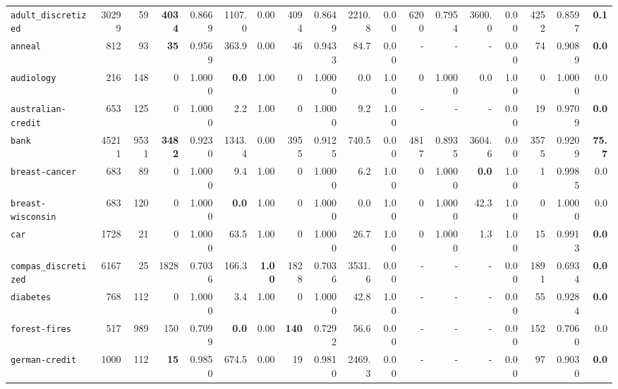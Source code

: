 \begin{tabular}{lccrrrrrrrrrrrrrrr}
\texttt{adult\_discretized} & \multicolumn{1}{r}{30299} & \multicolumn{1}{r}{59}  & \textbf{4034} & 0.8669 & 1107.0 & 0.00 & 4094 & 0.8649 & 2210.8 & 0.00 & 6200 & 0.7954 & 3600.0 & 0.00 & 4252 & 0.8597 & \textbf{0.1}\\
\texttt{anneal} & \multicolumn{1}{r}{812} & \multicolumn{1}{r}{93}  & \textbf{35} & 0.9569 & 363.9 & 0.00 & 46 & 0.9433 & 84.7 & 0.00 & - & - & - & 0.00 & 74 & 0.9089 & \textbf{0.0}\\
\texttt{audiology} & \multicolumn{1}{r}{216} & \multicolumn{1}{r}{148}  & 0 & 1.0000 & \textbf{0.0} & 1.00 & 0 & 1.0000 & 0.0 & 1.00 & 0 & 1.0000 & 0.0 & 1.00 & 0 & 1.0000 & 0.0\\
\texttt{australian-credit} & \multicolumn{1}{r}{653} & \multicolumn{1}{r}{125}  & 0 & 1.0000 & 2.2 & 1.00 & 0 & 1.0000 & 9.2 & 1.00 & - & - & - & 0.00 & 19 & 0.9709 & \textbf{0.0}\\
\texttt{bank} & \multicolumn{1}{r}{45211} & \multicolumn{1}{r}{9531}  & \textbf{3482} & 0.9230 & 1343.4 & 0.00 & 3955 & 0.9125 & 740.5 & 0.00 & 4817 & 0.8935 & 3604.6 & 0.00 & 3575 & 0.9209 & \textbf{75.7}\\
\texttt{breast-cancer} & \multicolumn{1}{r}{683} & \multicolumn{1}{r}{89}  & 0 & 1.0000 & 9.4 & 1.00 & 0 & 1.0000 & 6.2 & 1.00 & 0 & 1.0000 & \textbf{0.0} & 1.00 & 1 & 0.9985 & 0.0\\
\texttt{breast-wisconsin} & \multicolumn{1}{r}{683} & \multicolumn{1}{r}{120}  & 0 & 1.0000 & \textbf{0.0} & 1.00 & 0 & 1.0000 & 0.0 & 1.00 & 0 & 1.0000 & 42.3 & 1.00 & 0 & 1.0000 & 0.0\\
\texttt{car} & \multicolumn{1}{r}{1728} & \multicolumn{1}{r}{21}  & 0 & 1.0000 & 63.5 & 1.00 & 0 & 1.0000 & 26.7 & 1.00 & 0 & 1.0000 & 1.3 & 1.00 & 15 & 0.9913 & \textbf{0.0}\\
\texttt{compas\_discretized} & \multicolumn{1}{r}{6167} & \multicolumn{1}{r}{25}  & 1828 & 0.7036 & 166.3 & \textbf{1.00} & 1828 & 0.7036 & 3531.6 & 0.00 & - & - & - & 0.00 & 1891 & 0.6934 & \textbf{0.0}\\
\texttt{diabetes} & \multicolumn{1}{r}{768} & \multicolumn{1}{r}{112}  & 0 & 1.0000 & 3.4 & 1.00 & 0 & 1.0000 & 42.8 & 1.00 & - & - & - & 0.00 & 55 & 0.9284 & \textbf{0.0}\\
\texttt{forest-fires} & \multicolumn{1}{r}{517} & \multicolumn{1}{r}{989}  & 150 & 0.7099 & \textbf{0.0} & 0.00 & \textbf{140} & 0.7292 & 56.6 & 0.00 & - & - & - & 0.00 & 152 & 0.7060 & 0.0\\
\texttt{german-credit} & \multicolumn{1}{r}{1000} & \multicolumn{1}{r}{112}  & \textbf{15} & 0.9850 & 674.5 & 0.00 & 19 & 0.9810 & 2469.3 & 0.00 & - & - & - & 0.00 & 97 & 0.9030 & \textbf{0.0}\\

\end{tabular}
